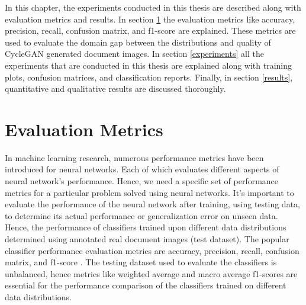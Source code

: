 \justifying
\setlength{\parskip}{1em}

In this chapter, the experiments conducted in this thesis are described along with evaluation metrics and results. In section \ref{EvaluationMetrics} the evaluation metrics like accuracy, precision, recall, confusion matrix, and f1-score are explained. These metrics are used to evaluate the domain gap between the distributions and quality of \ac{CycleGAN} generated document images. In section \ref{experiments} all the experiments that are conducted in this thesis are explained along with training plots, confusion matrices, and classification reports. Finally, in section \ref{results}, quantitative and qualitative results are discussed thoroughly.

\section{Evaluation Metrics}\label{EvaluationMetrics}


In machine learning research, numerous performance metrics have been introduced for neural networks. Each of which evaluates different aspects of neural network's performance. Hence, we need a specific set of performance metrics for a particular problem solved using neural networks. It's important to evaluate the performance of the neural network after training, using testing data, to determine its actual performance or generalization error on unseen data. Hence, the performance of classifiers trained upon different data distributions determined using annotated real document images (test dataset). The popular classifier performance evaluation metrics are accuracy, precision, recall, confusion matrix, and f1-score \cite{powers2020evaluation}. The testing dataset used to evaluate the classifiers is unbalanced, hence metrics like weighted average and macro average f1-scores are essential for the performance comparison of the classifiers trained on different data distributions. 

